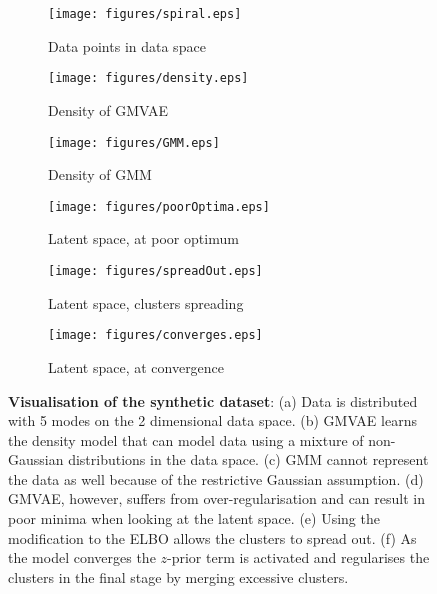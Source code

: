 \documentclass{article} \usepackage{iclr2017_conference,times}
\begin{document}
\begin{figure}[h]
\centering
	\begin{subfigure}{.33\textwidth}
	  \centering
	  \texttt{[image: figures/spiral.eps]}
	  \caption{Data points in data space}
      \label{fig:toyData}
	\end{subfigure}\begin{subfigure}{.33\textwidth}
	  \centering
	  \texttt{[image: figures/density.eps]}
	  \caption{Density of GMVAE}
      \label{fig:gmvaeDensity}
	\end{subfigure}\begin{subfigure}{.33\textwidth}
	  \centering
	  \texttt{[image: figures/GMM.eps]}
	  \caption{Density of GMM}
	  \label{fig:gmmDensity}
	\end{subfigure}

	\begin{subfigure}{.33\textwidth}
    \centering
	  \texttt{[image: figures/poorOptima.eps]}
	  \caption{Latent space, at poor optimum}
	  \label{fig:poorOptimal}
	\end{subfigure}\begin{subfigure}{.33\textwidth}
    \centering
	  \texttt{[image: figures/spreadOut.eps]}
	  \caption{Latent space, clusters spreading}
	  \label{fig:spread}
	\end{subfigure}\begin{subfigure}{.33\textwidth}
    \centering
    \texttt{[image: figures/converges.eps]}
	  \caption{Latent space, at convergence}
	  \label{fig:converge}
	\end{subfigure}

  \caption{\textbf{Visualisation of the synthetic dataset}: (a) Data is distributed with 5 modes on the 2 dimensional data space. (b) GMVAE learns the density model that can model data using a mixture of non-Gaussian distributions in the data space. (c) GMM cannot represent the data as well because of the restrictive Gaussian assumption. (d) GMVAE, however, suffers from over-regularisation and can result in poor minima when looking at the latent space. (e) Using the modification to the ELBO \citep{kingma2016improving} allows the clusters to spread out. (f) As the model converges the $z$-prior term is activated and regularises the clusters in the final stage by merging excessive clusters.}
  \label{fig:spiral}
\end{figure}
\end{document}
